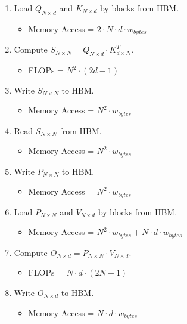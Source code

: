 \documentclass{article}
\begin{document}
\begin{enumerate}
    \item Load $Q_{N \times d}$ and $K_{N \times d}$ by blocks from HBM. 
    \begin{itemize}
        \item Memory Access = $2 \cdot N \cdot d \cdot w_{bytes}$
    \end{itemize}
    
    \item Compute $S_{N \times N} = Q_{N \times d} \cdot K^T_{d \times N}$. 
    \begin{itemize}
        \item FLOPs = $N^2 \cdot (2d - 1)$
    \end{itemize}
    
    \item Write $S_{N \times N}$ to HBM. 
    \begin{itemize}
        \item Memory Access = $N^2 \cdot w_{bytes}$
    \end{itemize}
    
    \item Read $S_{N \times N}$ from HBM. 
    \begin{itemize}
        \item Memory Access = $N^2 \cdot w_{bytes}$
    \end{itemize}
    
    \item Write $P_{N \times N}$ to HBM. 
    \begin{itemize}
        \item Memory Access = $N^2 \cdot w_{bytes}$
    \end{itemize}
    
    \item Load $P_{N \times N}$ and $V_{N \times d}$ by blocks from HBM. 
    \begin{itemize}
        \item Memory Access = $N^2 \cdot w_{bytes} + N \cdot d \cdot w_{bytes}$
    \end{itemize}
    
    \item Compute $O_{N \times d} = P_{N \times N} \cdot V_{N \times d}$. 
    \begin{itemize}
        \item FLOPs = $N \cdot d \cdot (2N - 1)$
    \end{itemize}
    
    \item Write $O_{N \times d}$ to HBM. 
    \begin{itemize}
        \item Memory Access = $N \cdot d \cdot w_{bytes}$
    \end{itemize}
\end{enumerate}
\end{document}
